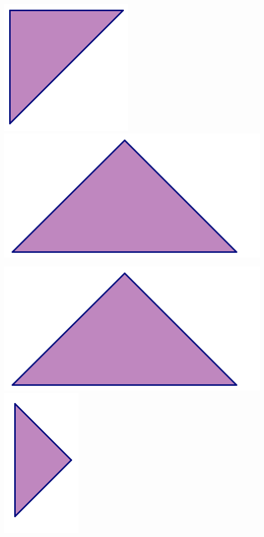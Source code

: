 \documentclass[12pt, reqno]{amsart}
\theoremstyle{remark}
\theoremstyle{definition}
\numberwithin{equation}{section}  %
\begin{document}
\begin{center}
\includegraphics[scale = .470]{medtri}
\hfill
\includegraphics[scale = .470]{bigtri}

\bigskip
\bigskip


\includegraphics[scale = .470]{bigtri}
\hfill
\includegraphics[scale = .470]{smtri}
\end{center}
\end{document}
